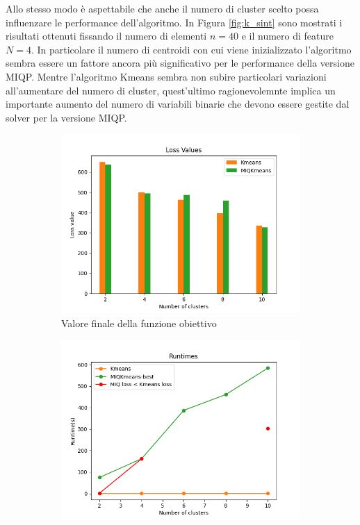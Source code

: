 \documentclass{article}
\begin{document}
    Allo stesso modo è aspettabile che anche il numero di cluster scelto possa influenzare le performance dell'algoritmo. In Figura \ref{fig:k_sint} sono mostrati i risultati ottenuti fissando il numero di elementi $n=40$ e il numero di feature $N=4$. In particolare il numero di centroidi con cui viene inizializzato l'algoritmo sembra essere un fattore ancora più significativo per le performance della versione MIQP.
    Mentre l'algoritmo Kmeans sembra non subire particolari variazioni all'aumentare del numero di cluster, quest'ultimo ragionevolemnte implica un importante aumento del numero di variabili binarie che devono essere gestite dal solver per la versione MIQP.\\
    \begin{figure}[H]
     \centering
     \begin{subfigure}[t]{0.49\linewidth}
         \centering
         \includegraphics[width=\linewidth]{../results/plots/loss_centers_sint}
         \caption{Valore finale della funzione obiettivo}
     \end{subfigure}
     \hfill
     \begin{subfigure}[t]{0.49\linewidth}
         \centering
         \includegraphics[width=\linewidth]{../results/plots/runtime_centers_sint}

\end{subfigure}
\end{figure}
\end{document}

